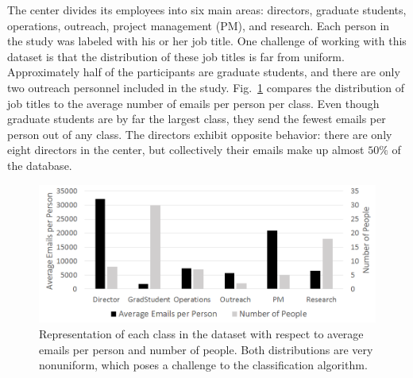 \documentclass[10pt,twocolumn,conference]{IEEEtran}
\begin{document}
\begin{table}[t]
\centering
\caption{A comparison between the internal dataset and the Enron email corpus.}
\label{tab:db_stats}
\end{table}


The center divides its employees into six main areas: directors, graduate students, operations, outreach, project management (PM), and research.
Each person in the study was labeled with his or her job title.
One challenge of working with this dataset is that the distribution of these job titles is far from uniform.
Approximately half of the participants are graduate students, and there are only two outreach personnel included in the study.
Fig.~\ref{fig:db_bar} compares the distribution of job titles to the average number of emails per person per class.
Even though graduate students are by far the largest class, they send the fewest emails per person out of any class.
The directors exhibit opposite behavior: there are only eight directors in the center, but collectively their emails make up almost $50\%$ of the database.

\begin{figure}[t]
	\centering
	\includegraphics[width=\columnwidth,trim={1mm 0mm 1mm 0mm},clip]{DatasetStatsBar_BW}
	\caption{Representation of each class in the dataset with respect to average emails per person and number of people.  Both distributions are very nonuniform, which poses a challenge to the classification algorithm.}
	\label{fig:db_bar}
\end{figure}
\end{document}
